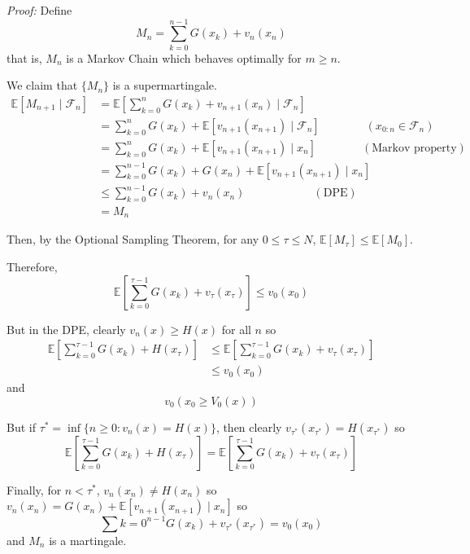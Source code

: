 \documentclass[12pt]{report}
\newcommand{\F}{\mathcal{F}}
\newcommand{\E}{\mathbb{E}}
\newenvironment*{tbox}[2][gray]{
    \begin{tcolorbox}[
        parbox=false,
        colback=#1!5!white,
        colframe=#1!75!black,
        breakable,
        title={#2}
    ]}
    {\end{tcolorbox}}
\begin{document}
    \begin{tbox}{\textbf{Theorem:} Suppose $\{v_0(x), v_1(x), \dots, v_N(x)\}$ is a solution to the DPE. Then $v_n(x) = V_n(x)$ for all $n$. Moreover, define $\tau^* = \inf \{n \geq 0: V_n(x) = H(x)\}$. Then $\tau^*$ is an optimal stopping time.}
        \emph{Proof:} Define 
        \[M_n = \sum_{k=0}^{n- 1} G(x_k) + v_n(x_n)\]
        that is, $M_n$ is a Markov Chain which behaves optimally for $m \geq n$. 

        We claim that $\{M_n\}$ is a supermartingale. 
        \begin{align*}
            \E[M_{n+1} \; | \; \F_n] &= \E\left[\sum_{k=0}^{n} G(x_k) + v_{n+1}(x_n) \; | \; \F_n\right]\\
            &= \sum_{k=0}^n G(x_k) + \E[v_{n+1}(x_{n+1}) \; | \; \F_n] \qquad \qquad (x_{0:n} \in \F_n)\\
            &= \sum_{k=0}^n G(x_k) + \E[v_{n+1}(x_{n+1}) \; | \; x_n] \qquad\qquad (\text{Markov property}) \\
            &= \sum_{k=0}^{n-1} G(x_k) + G(x_n) + \E[v_{n+1}(x_{n+1}) \; | \; x_n]\\
            &\leq \sum_{k=0}^{n-1} G(x_k) + v_n(x_n) \hspace{1in} (\text{DPE})\\
            &= M_n
        \end{align*}

        Then, by the Optional Sampling Theorem, for any $0\leq \tau \leq N$, $\E[M_{\tau}] \leq \E[M_0]$. 

        Therefore, 
        \[\E\left[\sum_{k=0}^{\tau - 1} G(x_k) + v_{\tau}(x_{\tau})\right] \leq v_0(x_0)\]

        But in the DPE, clearly $v_n(x) \geq H(x)$ for all $n$ so 
        \begin{align*}
            \E\left[\sum_{k=0}^{\tau - 1} G(x_k) + H(x_{\tau})\right] &\leq \E\left[\sum_{k=0}^{\tau - 1} G(x_k) + v_{\tau}(x_{\tau})\right]\\ 
                &\leq v_0(x_0) 
        \end{align*}
        and
        \[v_0(x_0 \geq V_0(x))\]

        But if $\tau^* = \inf\{n \geq 0: v_n(x) = H(x)\}$, then clearly $v_{\tau^*}(x_{\tau^*}) = H(x_{\tau^*})$ so 
        \[\E\left[\sum_{k=0}^{\tau - 1} G(x_k) + H(x_{\tau})\right] = \E\left[\sum_{k=0}^{\tau - 1} G(x_k) + v_{\tau}(x_{\tau})\right]\] 

        Finally, for $n < \tau^*$, $v_n(x_n) \neq H(x_n)$ so $v_n(x_n) = G(x_n) + \E[v_{n+1}(x_{n+1}) \; | \; x_n]$ so 
        \[\sum{k=0}^{n-1} G(x_k) + v_{\tau^*}(x_{\tau^*}) = v_0(x_0)\]
        and $M_n$ is a martingale. 
    \end{tbox}
\end{document}
